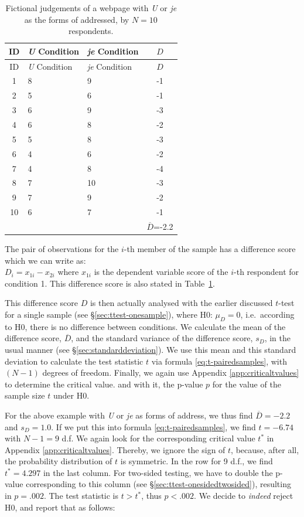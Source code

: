 \documentclass[
]{book}
\begin{document}
\begin{longtable}[]{@{}cllc@{}}
\caption{\label{tab:data-uje-paired} Fictional judgements of a webpage
with \emph{U} or \emph{je} as the forms of addressed, by \(N=10\) respondents.}\tabularnewline
\toprule
ID & \emph{U} Condition & \emph{je} Condition & \(D\)\tabularnewline
\midrule
\endfirsthead
\toprule
ID & \emph{U} Condition & \emph{je} Condition & \(D\)\tabularnewline
\midrule
\endhead
1 & 8 & 9 & -1\tabularnewline
2 & 5 & 6 & -1\tabularnewline
3 & 6 & 9 & -3\tabularnewline
4 & 6 & 8 & -2\tabularnewline
5 & 5 & 8 & -3\tabularnewline
6 & 4 & 6 & -2\tabularnewline
7 & 4 & 8 & -4\tabularnewline
8 & 7 & 10 & -3\tabularnewline
9 & 7 & 9 & -2\tabularnewline
10 & 6 & 7 & -1\tabularnewline
& & & \(\overline{D}\)=-2.2\tabularnewline
\bottomrule
\end{longtable}

The pair of observations for the \(i\)-th member of the sample has a
difference score which we can write as:\\
\(D_i = x_{1i} - x_{2i}\) where \(x_{1i}\) is the dependent
variable score of the \(i\)-th respondent for condition 1. This
difference score is also stated in
Table~\ref{tab:data-uje-paired}.

This difference score \(D\) is then actually analysed with the earlier discussed \(t\)-test for a single sample (see
§\ref{sec:ttest-onesample}), where H0: \(\mu_D=0\), i.e.~according to H0, there is no
difference between conditions. We calculate the mean of the difference score,
\(\overline{D}\), and the standard variance of the difference score, \(s_{D}\),
in the usual manner (see
§\ref{sec:standarddeviation}). We use this mean and this
standard deviation to calculate the test statistic \(t\) via formula
\eqref{eq:t-pairedsamples}, with \((N-1)\) degrees of freedom. Finally,
we again use
Appendix \ref{app:criticaltvalues} to determine the critical value.
and with it, the p-value \(p\) for the value of the sample size
\(t\) under H0.

For the above example with \emph{U} or \emph{je} as forms of address,
we thus find \(\overline{D}=-2.2\) and \(s_D=1.0\). If we put this into
formula \eqref{eq:t-pairedsamples}, we find \(t=-6.74\) with \(N-1=9\) d.f.
We again look for the corresponding critical value \(t^*\)
in Appendix \ref{app:criticaltvalues}. Thereby, we ignore the sign of \(t\),
because, after all, the probability distribution of \(t\) is symmetric.
In the row for 9 d.f., we find \(t^*=4.297\) in the last column.
For two-sided testing, we have to double the p-value corresponding to this
column (see
§\ref{sec:ttest-onesidedtwosided}), resulting in \(p=.002\).
The test statistic is \(t > t^*\), thus \(p<.002\). We decide to
\emph{indeed} reject H0, and report that as follows:
\end{document}
